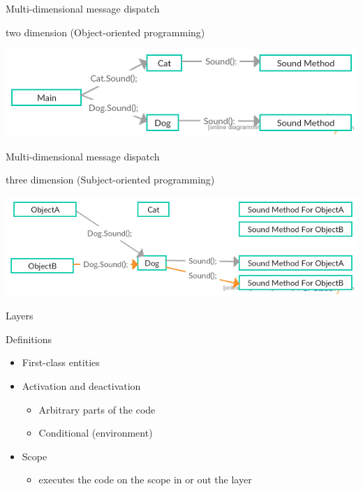 \documentclass[presentation]{beamer}
\begin{document}
\begin{frame}[label={sec:orge354381}]{Multi-dimensional message dispatch}
\begin{block}{two dimension (Object-oriented programming)}
\begin{center}
\includegraphics[width=.9\linewidth]{./two.png}
\end{center}
\end{block}
\end{frame}


\begin{frame}[label={sec:org58f7b3a}]{Multi-dimensional message dispatch}
\begin{block}{three dimension (Subject-oriented programming)}
\begin{center}
\includegraphics[width=.9\linewidth]{./three.png}
\end{center}
\end{block}
\end{frame}


\begin{frame}[label={sec:org8d86638}]{Layers}
\begin{block}{Definitions}
\begin{itemize}
\item First-class entities
\item Activation and deactivation
\begin{itemize}
\item Arbitrary parts of the code
\item Conditional (environment)
\end{itemize}
\item Scope
\begin{itemize}
\item executes the code on the scope in or out the layer
\end{itemize}
\end{itemize}
\end{block}
\end{frame}
\end{document}
